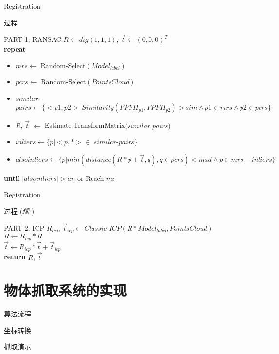 \documentclass[xcolor=table,notheorems,compress,blue]{beamer}
\begin{document}
	\begin{frame}{Registration}
		\vspace{-9pt}
		\begin{exampleblock}{过程}
		\end{exampleblock}
		\vspace{-18pt}
		\begin{exampleblock}{\small{PART 1: RANSAC}}
			$R\leftarrow dig(1,1,1)$, $\vec t\leftarrow (0,0,0)^T$ 
			\\ \textbf{repeat} 
			\begin{itemize}
				\item $mrs \leftarrow $ Random-Select$(Model_{label})$
				\item $pcrs \leftarrow$ Random-Select$(Points Cloud)$
				\item $similar$-$pairs \leftarrow \{<p1,p2>|Similarity(FPFH_{p1},FPFH_{p2})>sim  \wedge p1 \in mrs \wedge p2 \in pcrs\}$
				\item $R$, $\vec t$ $\leftarrow$ Estimate-TransformMatrix$(similar$-$pairs)$
				\item $inliers \leftarrow \{p| <p,*> \in $ $similar$-$pairs\}$
				\item $alsoinliers \leftarrow \{p| min (distance(R*p+\vec t,q), q\in pcrs) < mad \wedge p \in mrs-inliers \}$
			\end{itemize}
			\textbf{until} \quad $|alsoinliers| > an$ or Reach $mi$
		\end{exampleblock}
	\end{frame}
	\begin{frame}{Registration}
		\begin{exampleblock}{过程 (\emph{续} )}
		\end{exampleblock}
		\vspace{-20pt}
		\begin{exampleblock}{\small{PART 2: ICP}}
			$R_{icp}$, $\vec t_{icp} \leftarrow Classic$-$ICP(R * Model_{label}, Points Cloud)$
			\\ $R \leftarrow R_{icp} * R$
			\\ $\vec t \leftarrow R_{icp} * \vec t + \vec t_{icp}$
			\\ \textbf{return} $R$, $\vec t$
		\end{exampleblock}
	\end{frame}	



\section{物体抓取系统的实现}	
	\begin{frame}{算法流程}
		
	\end{frame}	
	\begin{frame}{坐标转换}
		
	\end{frame}	
	\begin{frame}{抓取演示}
		
	\end{frame}	
\end{document}
